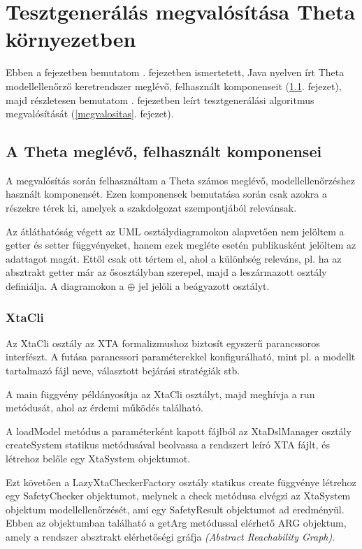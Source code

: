 
\chapter{Tesztgenerálás megvalósítása Theta környezetben} \label{main-gyakorlat}

Ebben a fejezetben bemutatom . fejezetben ismertetett, Java nyelven írt Theta  modellellenőrző keretrendszer meglévő, felhasznált komponenseit (\ref{theta-felhasznalt}. fejezet), majd részletesen bemutatom . fejezetben leírt tesztgenerálási algoritmus megvalósítását (\ref{megvalositas}. fejezet).

\section{A Theta meglévő, felhasznált komponensei} \label{theta-felhasznalt}

A megvalósítás során felhasználtam a Theta számos meglévő, modellellenőrzéshez használt komponensét. Ezen komponensek bemutatása során csak azokra a részekre térek ki, amelyek a szakdolgozat szempontjából relevánsak.

Az átláthatóság végett az UML osztálydiagramokon alapvetően nem jelöltem a getter és setter függvényeket, hanem ezek megléte esetén publikusként jelöltem az adattagot magát. Ettől csak ott tértem el, ahol a különbség releváns, pl. ha az absztrakt getter már az ősosztályban szerepel, majd a leszármazott osztály definiálja. A diagramokon a $\oplus$ jel jelöli a beágyazott osztályt.

\subsection{XtaCli}
Az \textsf{XtaCli} osztály az XTA formalizmushoz biztosít egyszerű parancssoros interfészt. A futása parancssori paraméterekkel konfigurálható, mint pl. a modellt tartalmazó fájl neve, választott bejárási stratégiák stb.

A \textsf{main} függvény példányosítja az \textsf{XtaCli} osztályt, majd meghívja a \textsf{run} metódusát, ahol az érdemi működés található.

A \textsf{loadModel} metódus a paraméterként kapott fájlból az \textsf{XtaDslManager} osztály \textsf{createSystem} statikus metódusával beolvassa a rendszert leíró XTA fájlt, és létrehoz belőle egy \textsf{XtaSystem} objektumot.

Ezt követően a \textsf{LazyXtaCheckerFactory} osztály statikus \textsf{create} függvénye létrehoz egy \textsf{SafetyChecker} objektumot, melynek a \textsf{check} metódusa elvégzi az \textsf{XtaSystem} objektum modellellenőrzését, ami egy \textsf{SafetyResult} objektumot ad eredményül. Ebben az objektumban található a \textsf{getArg} metódussal elérhető \textsf{ARG} objektum, amely a rendszer absztrakt elérhetőségi gráfja \emph{(Abstract Reachability Graph)}.

